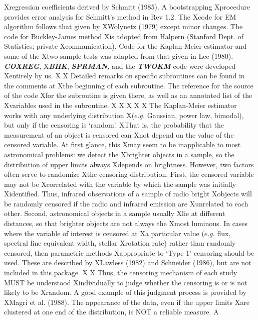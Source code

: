 Xregression coefficients derived by Schmitt (1985).  A bootstrapping 
Xprocedure provides error analysis for Schmitt's method in Rev 1.2.  The 
Xcode for EM algorithm follows that given by 
XWolynetz (1979) except minor changes. The code for Buckley-James method 
Xis adopted from Halpern (Stanford Dept. of Statistics; private 
Xcommunication).  Code for the Kaplan-Meier estimator and some of the 
Xtwo-sample tests was adapted from that given in Lee (1980).  {\sl\bf COXREG}, 
X{\sl\bf BHK}, {\sl\bf SPRMAN}, and the {\sl\bf TWOKM} code were developed 
Xentirely by us.
X   
X     Detailed remarks on specific subroutines can be found in the comments at 
Xthe beginning of each subroutine.  The reference for the source of the code 
Xfor the subroutine is given there, as well as an annotated list of the 
Xvariables used in the subroutine.
X
X\newpage
X
X 
X     The Kaplan-Meier estimator works with any underlying distribution
X($e.g.$ Gaussian, power law, bimodal), but only if the censoring is `random'.
XThat is, the probability that the measurement of an object is censored can
Xnot depend on the value of the censored variable.   At first glance, this
Xmay seem to be inapplicable to most astronomical problems:  we detect the
Xbrighter objects in a sample, so the distribution of upper limits always 
Xdepends on brightness.  However, two factors often serve to randomize 
Xthe censoring distribution.  First, the censored variable may not be 
Xcorrelated with the variable by which the sample was initially 
Xidentified.  Thus, infrared observations of a sample of radio bright 
Xobjects will be randomly censored if the radio and infrared emission are
Xunrelated to each other.  Second, astronomical objects in a sample usually
Xlie at different distances, so that brighter objects are not always the 
Xmost luminous.  In cases where the variable of interest is censored at 
Xa particular value ($e.g.$ flux, spectral line equivalent width, stellar 
Xrotation rate)  rather than randomly censored, then parametric methods 
Xappropriate to `Type 1' censoring should be used.  These are described by 
XLawless (1982) and Schneider (1986), but are not included in this package.
X 
X     Thus, the censoring mechanism of each study MUST be understood  
Xindividually to judge whether the censoring is or is not likely to be  
Xrandom.  A good example of this judgment process is provided by 
XMagri et al. (1988).  The appearance of the data, even if the upper limits 
Xare clustered at one end of the distribution, is NOT a reliable measure. A 
